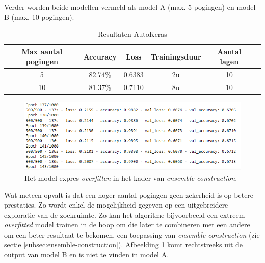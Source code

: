 Verder worden beide modellen vermeld als model A (max. 5 pogingen) en model B (max. 10 pogingen).

\begin{table}[ht]
    \centering
    \begin{tabular}{c c c c c c} %
        \hline\hline %
        Max aantal pogingen & Accuracy & Loss & Trainingsduur & Aantal lagen \\ [0.5ex] %
        \hline %
        5   & 82.74\%   & 0.6383   & 2u    & 10 \\ 
        \hline %
        10   & 81.37\%   & 0.7110   & 8u    & 10 \\ 
        \hline
    \end{tabular}
    \caption{Resultaten AutoKeras}
    \label{table:autokeras-results}
\end{table}

\begin{figure}
    \centering
    \includegraphics[width=\linewidth]{img/autokeras-overfit.png}
    \caption{Het model expres \textit{overfitten} in het kader van \textit{ensemble construction}.}
    \label{fig:autokeras-overfit}
\end{figure}

Wat meteen opvalt is dat een hoger aantal pogingen geen zekerheid is op betere prestaties. Zo wordt enkel de mogelijkheid gegeven op een uitgebreidere exploratie van de zoekruimte. Zo kan het algoritme bijvoorbeeld een extreem \textit{overfitted} model trainen in de hoop om die later te combineren met een andere om een beter resultaat te bekomen, een toepassing van \textit{ensemble construction} (zie sectie \ref{subsec:ensemble-construction}). Afbeelding \ref{fig:autokeras-overfit} komt rechtstreeks uit de output van model B en is niet te vinden in model A.

